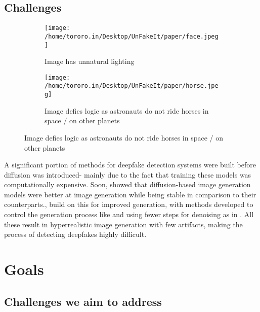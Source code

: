 \documentclass[10pt,twocolumn,letterpaper]{article}
\begin{document}
\subsection{Challenges}
\begin{figure}[h]
	\centering
	\begin{subfigure}{0.45\columnwidth}
		\texttt{[image: /home/tororo.in/Desktop/UnFakeIt/paper/face.jpeg]}
		\caption{Image has unnatural lighting}
	\end{subfigure}
	\hfill
	\begin{subfigure}{0.45\columnwidth}
		\texttt{[image: /home/tororo.in/Desktop/UnFakeIt/paper/horse.jpeg]}
		\caption{Image defies logic as astronauts do not ride horses in space / on other planets}
	\end{subfigure}
	
\end{figure}


A significant portion of methods for deepfake detection systems were built before diffusion \cite{hoDenoisingDiffusionProbabilistic2020} was introduced- mainly due to the fact that training these models was computationally expensive. Soon, \cite{dhariwalDiffusionModelsBeat2021} showed that diffusion-based image generation models were better at image generation while being stable in comparison to their counterparts.\cite{rombachHighResolutionImageSynthesis2022}, \cite{lipmanFlowMatchingGenerative2023} build on this for improved generation, with methods developed to control the generation process like \cite{ruizDreamBoothFineTuning2023, zhangAddingConditionalControl2023} and using fewer steps for denoising as in \cite{lipmanFlowMatchingGenerative2023}. All these result in hyperrealistic image generation with few artifacts, making the process of detecting deepfakes highly difficult. 


\section{Goals}

\subsection{Challenges we aim to address}
\end{document}
